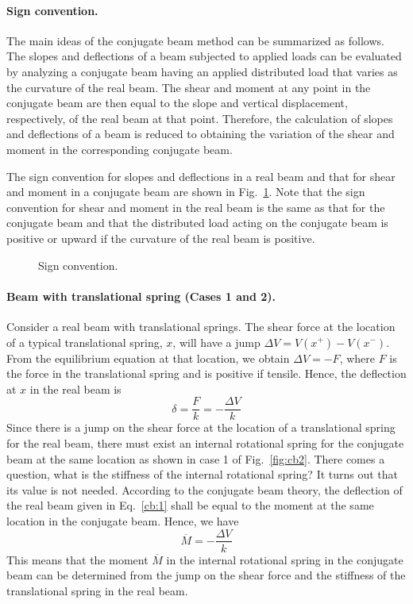 \paragraph{Sign convention.}
The main ideas of the conjugate beam method can be summarized as follows. The slopes and deflections of a beam subjected to applied loads can be evaluated by analyzing a conjugate beam having an applied distributed load that varies as the curvature of the real beam. The shear and moment at any point in the conjugate beam are then equal to the slope and vertical displacement, respectively, of the real beam at that point. Therefore, the calculation of slopes and deflections of a beam is reduced to obtaining the variation of the shear and moment in the corresponding conjugate beam.

The sign convention for slopes and deflections in a real beam and that for shear and moment in a conjugate beam are shown in Fig.~\ref{fig:cb1}. Note that the sign convention for shear and moment in the real beam is the same as that for the conjugate beam and that the distributed load acting on the conjugate beam is positive or upward if the curvature of the real beam is positive.
\begin{figure}[H]
  \centering
  
  \caption{Sign convention.}
  \label{fig:cb1}
\end{figure}

\paragraph{Beam with translational spring (Cases 1 and 2).}
Consider a real beam with translational springs. The shear force at the location of a typical translational spring, $x$, will have a jump $\Delta V = V(x^+) - V(x^-)$. From the equilibrium equation at that location, we obtain $\Delta V = -F$, where $F$ is the force in the translational spring and is positive if tensile. Hence, the deflection at $x$ in the real beam is
\begin{equation}
  \delta = \frac Fk = -\frac{\Delta V}{k} \tag{1}\label{cb:1}
\end{equation}
Since there is a jump on the shear force at the location of a translational spring for the real beam, there must exist an internal rotational spring for the conjugate beam at the same location as shown in case 1 of Fig.~\ref{fig:cb2}. There comes a question, what is the stiffness of the internal rotational spring? It turns out that its value is not needed. According to the conjugate beam theory, the deflection of the real beam given in Eq.~\eqref{cb:1} shall be equal to the moment at the same location in the conjugate beam. Hence, we have
\begin{equation}
  \overline M = -\frac{\Delta V}{k} \tag{2}\label{cb:2}
\end{equation}
This means that the moment $\overline M$ in the internal rotational spring in the conjugate beam can be determined from the jump on the shear force and the stiffness of the translational spring in the real beam.

